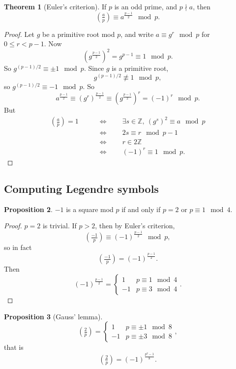 \documentclass{article}
\newcommand{\Z}{\mathbb{Z}}
\newcommand{\rb}[1]{\left( #1 \right)}
\newcommand{\legendre}[2]{\rb{\tfrac{#1}{#2}}}
\theoremstyle{definition}\newtheorem{definition}{Definition}
\theoremstyle{definition}\newtheorem{remark}[definition]{Remark}
\theoremstyle{definition}\newtheorem*{example}{Example}
\theoremstyle{definition}\newtheorem*{note}{Note}
\newtheorem{proposition}[definition]{Proposition}
\newtheorem{theorem}[definition]{Theorem}
\begin{document}

\begin{theorem}[Euler's criterion]
If $ p $ is an odd prime, and $ p \nmid a $, then
$$ \legendre{a}{p} \equiv a^{\tfrac{p - 1}{2}} \mod p. $$
\end{theorem}

\begin{proof}
Let $ g $ be a primitive root mod $ p $, and write $ a \equiv g^r \mod p $ for $ 0 \le r < p - 1 $. Now
$$ \rb{g^{\tfrac{p - 1}{2}}}^2 = g^{p - 1} \equiv 1 \mod p. $$
So $ g^{\rb{p - 1} / 2} \equiv \pm 1 \mod p $. Since $ g $ is a primitive root,
$$ g^{\rb{p - 1} / 2} \not\equiv 1 \mod p, $$
so $ g^{\rb{p - 1} / 2} \equiv -1 \mod p $. So
$$ a^{\tfrac{p - 1}{2}} \equiv \rb{g^r}^{\tfrac{p - 1}{2}} \equiv \rb{g^{\tfrac{p - 1}{2}}}^r = \rb{-1}^r \mod p. $$
But
\begin{align*}
\legendre{a}{p} = 1 \qquad
& \iff \qquad \exists s \in \Z, \ \rb{g^s}^2 \equiv a \mod p \\
& \iff \qquad 2s \equiv r \mod p - 1 \\
& \iff \qquad r \in 2\Z \\
& \iff \qquad \rb{-1}^r \equiv 1 \mod p.
\end{align*}
\end{proof}

\subsection{Computing Legendre symbols}

\begin{proposition}
$ -1 $ is a square mod $ p $ if and only if $ p = 2 $ or $ p \equiv 1 \mod 4 $.
\end{proposition}

\begin{proof}
$ p = 2 $ is trivial. If $ p > 2 $, then by Euler's criterion,
$$ \legendre{-1}{p} \equiv \rb{-1}^{\tfrac{p - 1}{2}} \mod p, $$
so in fact
$$ \legendre{-1}{p} = \rb{-1}^{\tfrac{p - 1}{2}}. $$
Then
$$ \rb{-1}^{\tfrac{p - 1}{2}} = \begin{cases}
1 & p \equiv 1 \mod 4 \\
-1 & p \equiv 3 \mod 4
\end{cases}. $$
\end{proof}

\begin{proposition}[Gauss' lemma]
$$ \legendre{2}{p} = \begin{cases}
1 & p \equiv \pm 1 \mod 8 \\
-1 & p \equiv \pm 3 \mod 8
\end{cases}, $$
that is
$$ \legendre{2}{p} = \rb{-1}^{\tfrac{p^2 - 1}{8}}. $$
\end{proposition}
\end{document}
